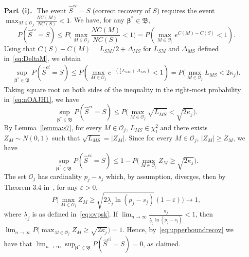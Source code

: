 \documentclass[
  12pt]{article}
\newcommand{\OO}{\mathcal{O}}
\newcommand{\bbeta}{\boldsymbol{\beta}}
\newcommand{\bB}{\mathfrak{B}}
\begin{document}
\textbf{Part (i).}\,\,
The event $\hat{S}^{ei}=S$ (correct recovery of $S$) requires the event 
$\max_{M\in \OO_j}\frac{NC(M)}{NC(S)}<1$. We have, for any $\bbeta^*\in \bB$,
$$P(\hat{S}^{ei}=S) 
\leq P\Big(\max_{M\in \OO_j}\frac{NC(M)}{NC(S)}<1\Big)
= P \left( \max_{M\in \OO_j} e^{C(M)-C(S)} <1 \right).$$
Using that $C(S)-C(M)=L_{SM}/2 + \Delta_{MS}$ for $L_{SM}$ and $\Delta_{MS}$ defined in~\eqref{eq:DeltaM}, we obtain
\begin{align}\label{eq:nOAJH1}
\sup_{\bbeta^*\in \bB}P(\hat{S}^{ei}=S) 
\leq P \left( \max_{M\in \OO_j} e^{-(\frac{1}{2} L_{SM} + \Delta_{MS})} < 1 \right)
=
P\Big(\max_{M\in \OO_j}L_{MS}<2\kappa_j\Big).
\end{align}
Taking square root on both sides of the inequality in the right-most probability in~\eqref{eq:nOAJH1}, we have
\begin{equation}\label{eq:oSBV}
    \sup_{\bbeta^*\in \bB}P(\hat{S}^{ei}=S) 
\leq P\Big(\max_{M\in \OO_j}\sqrt{L_{MS}}<\sqrt{2\kappa_j}\Big).
\end{equation}
By Lemma~\ref{lemma:s7}, for every $M\in \OO_j$, $L_{MS}\in \chi^2_1$ and there exists $Z_M\sim N(0,1)$ such that $\sqrt{L_{MS}}=|Z_M|$. Since for every $M\in \OO_j$, $|Z_M|\geq Z_M$, we have
\begin{equation}\label{eq:upperboundrecov}
    \sup_{\bbeta^*\in \bB}P(\hat{S}^{ei}=S) \leq  1-P\big(\max_{M\in \OO_j}Z_M\geq\sqrt{2\kappa_j}\Big).
\end{equation}
The set $\OO_j$ has cardinality $p_j-s_j$ which, by assumption, diverges, then by Theorem 3.4 in~\cite{hartigan}, for any $\varepsilon>0$,
$$P\big(\max_{M\in \OO_j}Z_M \geq  \sqrt{2\underline{\lambda}_j \ln(p_j-s_j)}(1-\varepsilon)\big) \to 1,$$
where $\underline{\lambda}_j$ is as defined in~\eqref{eq:ovpsk}.
If $\lim_{n\to\infty}\frac{\kappa_j}{\underline{\lambda}_j\ln(p_j-s_j)} <1$, then $\lim_{n \to \infty} P\big(\max_{M\in \OO_j}Z_M\geq\sqrt{2\kappa_j}\big) = 1$. Hence, by~\eqref{eq:upperboundrecov} we have that $\lim_{n \to \infty} \sup_{\bbeta^*\in \bB}P(\hat{S}^{ei}=S) = 0$, as claimed.
\end{document}
